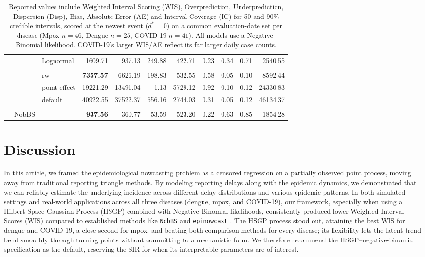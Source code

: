 \documentclass[12pt]{article}
\begin{document}
\begin{table}[!htb]
\begin{tabular}{r | >{\raggedleft\arraybackslash}p{0.55in} | >{\raggedleft\arraybackslash}p{0.85in} | r r r r r r r r}
& & \cellcolor{delayA!25}Lognormal & \cellcolor{delayA!25}1609.71 & \cellcolor{delayA!25}937.13 & \cellcolor{delayA!25}249.88 & \cellcolor{delayA!25}422.71 & \cellcolor{delayA!25}0.23 & \cellcolor{delayA!25}0.34 & \cellcolor{delayA!25}0.71 & \cellcolor{delayA!25}2540.55 \\
\\
& \multirow{3}{*}{\texttt{epinowcast}}
& rw            & \bf 7357.57 & 6626.19 & 198.83 & 532.55 & 0.58 & 0.05 & 0.10 & 8592.44 \\
& & point effect  & 19221.29 & 13491.04 & 1.13 & 5729.12 & 0.92 & 0.10 & 0.12 & 24330.83 \\
& & default       & 40922.55 & 37522.37 & 656.16 & 2744.03 & 0.31 & 0.05 & 0.12 & 46134.37 \\
\\
& NobBS & — & \bf 937.56 & 360.77 & 53.59 & 523.20 & 0.22 & 0.63 & 0.85 & 1854.28 \\

\bottomrule
\end{tabular}
\caption*{\tiny Reported values include Weighted Interval Scoring (WIS), Overprediction, Underprediction, Dispersion (Disp), Bias, Absolute Error (AE) and Interval Coverage (IC) for 50 and 90\% credible intervals, scored at the newest event ($d^*=0$) on a common evaluation-date set per disease (Mpox $n=46$, Dengue $n=25$, COVID-19 $n=41$). All models use a Negative-Binomial likelihood. COVID-19's larger WIS/AE reflect its far larger daily case counts.}
\label{tab:wis_combined}
\end{table}

\section{Discussion}

In this article, we framed the epidemiological nowcasting problem as a censored regression on a partially observed point process, moving away from traditional reporting triangle methods. By modeling reporting delays along with the epidemic dynamics, we demonstrated that we can reliably estimate the underlying incidence across different delay distributions and various epidemic patterns. In both simulated settings and real-world applications {\color{red}across all three diseases (dengue, mpox, and COVID-19)}, our framework, especially when using a Hilbert Space Gaussian Process (HSGP) combined with Negative Binomial likelihoods, consistently produced lower Weighted Interval Scores (WIS) compared to established methods like \texttt{NobBS} and \texttt{epinowcast} \cite{nobbs, epinowcast}. {\color{red} The HSGP process stood out, attaining the best WIS for dengue and COVID-19, a close second for mpox, and beating both comparison methods for every disease; its flexibility lets the latent trend bend smoothly through turning points without committing to a mechanistic form. We therefore recommend the HSGP--negative-binomial specification as the default, reserving the SIR for when its interpretable parameters are of interest.}
\end{document}
